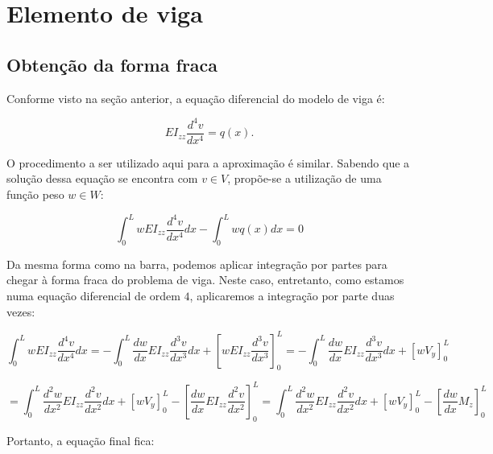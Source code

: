
\cleardoublepage
\section{Elemento de viga}

    \subsection{Obtenção da forma fraca}

        Conforme visto na seção anterior, a equação diferencial do modelo de viga é:

        \begin{equation}
            EI_{zz}\frac{d^4v}{dx^4} = q(x).
        \end{equation}

        O procedimento a ser utilizado aqui para a aproximação é similar. Sabendo que a solução dessa equação se encontra com $v \in V$, propõe-se a utilização de uma função peso $w \in W$:

        \begin{equation}
            \int_0^L w EI_{zz}\frac{d^4v}{dx^4} dx - \int_0^L w q(x) dx = 0
        \end{equation}

       Da mesma forma como na barra, podemos aplicar integração por partes para chegar à forma fraca do problema de viga. Neste caso, entretanto, como estamos numa equação diferencial de ordem $4$, aplicaremos a integração por parte duas vezes:

        \begin{equation*}
            \int_0^L w EI_{zz}\frac{d^4v}{dx^4} dx = -\int_0^L \frac{dw}{dx} EI_{zz}\frac{d^3v}{dx^3} dx + \left[w EI_{zz}\frac{d^3v}{dx^3}\right]_0^L = -\int_0^L \frac{dw}{dx} EI_{zz}\frac{d^3v}{dx^3} dx + \left[w V_y\right]_0^L
        \end{equation*}

        \begin{equation}
            = \int_0^L \frac{d^2w}{dx^2} EI_{zz}\frac{d^2v}{dx^2} dx + \left[w V_y\right]_0^L - \left[\frac{dw}{dx} EI_{zz}\frac{d^2v}{dx^2}\right]_0^L = \int_0^L \frac{d^2w}{dx^2} EI_{zz}\frac{d^2v}{dx^2} dx + \left[w V_y\right]_0^L - \left[\frac{dw}{dx} M_z\right]_0^L
        \end{equation}

        Portanto, a equação final fica:

